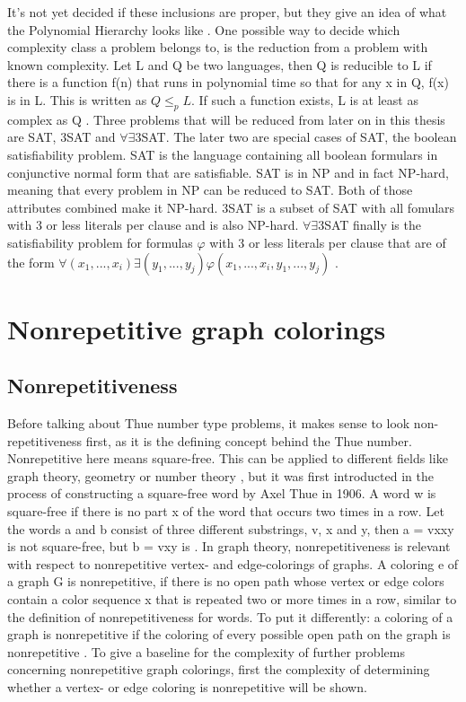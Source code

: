 \documentclass[12pt,a4paper]{article}
\begin{document}
It's not yet decided if these inclusions are proper, but they give an idea of what the Polynomial Hierarchy looks like \citep{Stockmeyer1976}.
\newline
One possible way to decide which complexity class a problem belongs to, is the reduction from a problem with known complexity. Let L and Q be two languages, then Q is reducible to L if there is a function f(n) that runs in polynomial time so that for any x in Q, f(x) is in L. This is written as $Q \leq_p L$. If such a function exists, L is at least as complex as Q \citep{Davis1983}. 
\newline
Three problems that will be reduced from later on in this thesis are SAT, 3SAT and $\forall \exists$3SAT. The later two are special cases of SAT, the boolean satisfiability problem. SAT is the language containing all boolean formulars in conjunctive normal form that are satisfiable. SAT is in NP and in fact NP-hard, meaning that every problem in NP can be reduced to SAT. Both of those attributes combined make it NP-hard. 3SAT is a subset of SAT with all fomulars with 3 or less literals per clause and is also NP-hard. $\forall \exists$3SAT finally is the satisfiability problem for formulas $\varphi$ with 3 or less literals per clause that are of the form $\forall (x_1, ..., x_i) \exists (y_1, ..., y_j) \varphi(x_1, ..., x_i, y_1, ..., y_j)$ \citep{Schaefer2002}.

\newpage
\section{Nonrepetitive graph colorings}
\subsection{Nonrepetitiveness}
Before talking about Thue number type problems, it makes sense to look non-repetitiveness first, as it is the defining concept behind the  Thue number. Nonrepetitive here means square-free. This can be applied to different fields like graph theory, geometry or number theory \citep{Grytczuk2008}, but it was first introducted in the process of constructing a square-free word by Axel Thue in 1906. A word w is square-free if there is no part x of the word that occurs two times in a row. Let the words a and b consist of three different substrings, v, x and y, then a = vxxy is not square-free, but b = vxy is \citep{Thue1906}.
\newline
In graph theory, nonrepetitiveness is relevant with respect to nonrepetitive vertex- \citep{Marx2009} and edge-colorings of graphs. A coloring e of a graph G is nonrepetitive, if there is no open path whose vertex or edge colors contain a color sequence x that is repeated two or more times in a row, similar to the definition of nonrepetitiveness for words. To put it differently: a coloring of a graph is nonrepetitive if the coloring of every possible open path on the graph is nonrepetitive \citep{Alon2002}. To give a baseline for the complexity of further problems concerning nonrepetitive graph colorings, first the complexity of determining whether a vertex- or edge coloring is nonrepetitive will be shown.
\end{document}

